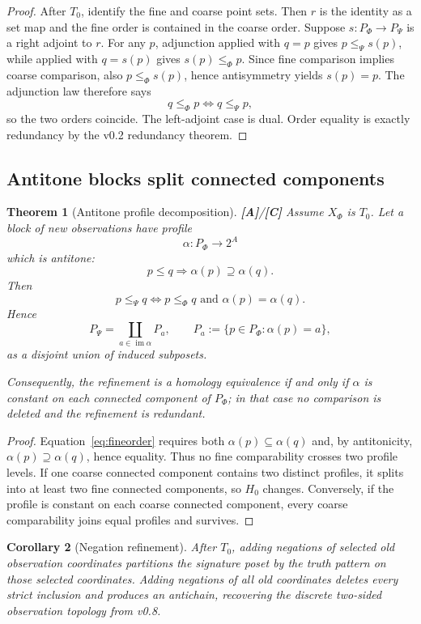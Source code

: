 \documentclass[11pt]{article}
\newtheorem{theorem}{Theorem}[section]
\newtheorem{corollary}[theorem]{Corollary}
\theoremstyle{definition}
\newcommand{\im}{\operatorname{im}}
\newcommand{\statusA}{\textbf{[A]}}
\newcommand{\statusC}{\textbf{[C]}}
\begin{document}
\begin{proof}
After $T_0$, identify the fine and coarse point sets. Then $r$ is the identity as a set map and the fine order is contained in the coarse order. Suppose $s:P_\Phi\to P_\Psi$ is a right adjoint to $r$. For any $p$, adjunction applied with $q=p$ gives $p\le_\Psi s(p)$, while applied with $q=s(p)$ gives $s(p)\le_\Phi p$. Since fine comparison implies coarse comparison, also $p\le_\Phi s(p)$, hence antisymmetry yields $s(p)=p$. The adjunction law therefore says
\[
q\le_\Phi p\iff q\le_\Psi p,
\]
so the two orders coincide. The left-adjoint case is dual. Order equality is exactly redundancy by the v0.2 redundancy theorem.
\end{proof}

\subsection{Antitone blocks split connected components}

\begin{theorem}[Antitone profile decomposition]\label{thm:antitoneblock}
\statusA/\statusC\;
Assume $X_\Phi$ is $T_0$. Let a block of new observations have profile
\[
\alpha:P_\Phi\to2^A
\]
which is antitone:
\[
p\le q\Longrightarrow\alpha(p)\supseteq\alpha(q).
\]
Then
\[
p\le_\Psi q
\iff
p\le_\Phi q\text{ and }\alpha(p)=\alpha(q).
\]
Hence
\[
P_\Psi=\coprod_{a\in\im\alpha} P_a,
\qquad
P_a:=\{p\in P_\Phi:\alpha(p)=a\},
\]
as a disjoint union of induced subposets.

Consequently, the refinement is a homology equivalence if and only if $\alpha$ is constant on each connected component of $P_\Phi$; in that case no comparison is deleted and the refinement is redundant.
\end{theorem}

\begin{proof}
Equation~\eqref{eq:fineorder} requires both $\alpha(p)\subseteq\alpha(q)$ and, by antitonicity, $\alpha(p)\supseteq\alpha(q)$, hence equality. Thus no fine comparability crosses two profile levels. If one coarse connected component contains two distinct profiles, it splits into at least two fine connected components, so $H_0$ changes. Conversely, if the profile is constant on each coarse connected component, every coarse comparability joins equal profiles and survives.
\end{proof}

\begin{corollary}[Negation refinement]
After $T_0$, adding negations of selected old observation coordinates partitions the signature poset by the truth pattern on those selected coordinates. Adding negations of \emph{all} old coordinates deletes every strict inclusion and produces an antichain, recovering the discrete two-sided observation topology from v0.8.
\end{corollary}
\end{document}
